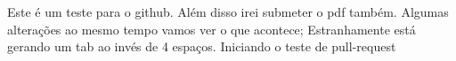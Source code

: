 \documentclass{article}
\begin{document}
	Este é um teste para o github.
	Além disso irei submeter o pdf também.
	Algumas alterações ao mesmo tempo vamos ver o que acontece;
	Estranhamente está gerando um tab ao invés de 4 espaços.
	Iniciando o teste de pull-request
\end{document}
